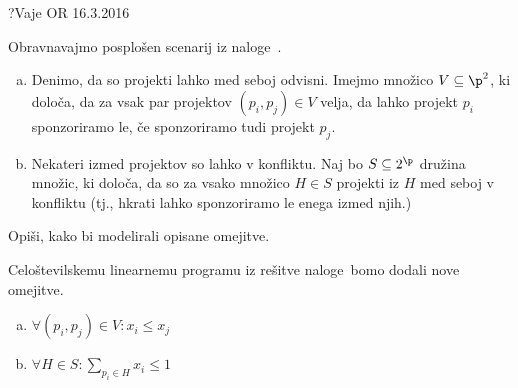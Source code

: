 \begin{naloga}{?}{Vaje OR 16.3.2016}
\begin{vprasanje}
Obravnavajmo posplošen scenarij iz naloge~\nal[proj].
\begin{enumerate}[(a)]
\item Denimo, da so projekti lahko med seboj odvisni.
Imejmo množico $V \subseteq \p^2$, ki določa,
da za vsak par projektov $(p_i, p_j) \in V$ velja,
da lahko projekt $p_i$ sponzoriramo le,
če sponzoriramo tudi projekt $p_j$.

\item Nekateri izmed projektov so lahko v konfliktu.
Naj bo $S \subseteq 2^\p$ družina množic, ki določa,
da so za vsako množico $H \in S$ projekti iz $H$ med seboj v konfliktu
(tj., hkrati lahko sponzoriramo le enega izmed njih.)
\end{enumerate}
Opiši, kako bi modelirali opisane omejitve.
\end{vprasanje}

\begin{odgovor}
Celoštevilskemu linearnemu programu iz rešitve naloge~\res[proj]
bomo dodali nove omejitve.
\begin{enumerate}[(a)]
\item $\displaystyle \forall (p_i, p_j) \in V : x_i \le x_j$
\item $\displaystyle \forall H \in S : \sum_{p_i \in H} x_i \le 1$
\end{enumerate}
\end{odgovor}
\end{naloga}
